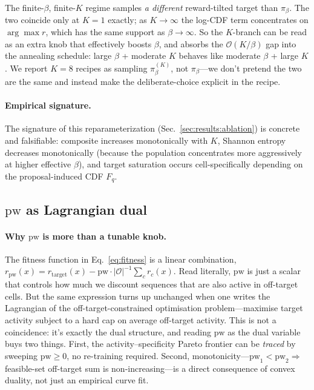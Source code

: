 \begin{remark}\label{rem:K_practical}
The finite-$\beta$, finite-$K$ regime samples \emph{a different} reward-tilted target than $\pi_\beta$. The two coincide only at $K\!=\!1$ exactly; as $K\!\to\!\infty$ the log-CDF term concentrates on $\arg\max r$, which has the same support as $\beta\!\to\!\infty$. So the $K$-branch can be read as an extra knob that effectively boosts $\beta$, and \gpa{} absorbs the $\mathcal{O}(K/\beta)$ gap into the annealing schedule: large $\beta$ + moderate $K$ behaves like moderate $\beta$ + large $K$. We report $K\!=\!8$ recipes as sampling $\pi_\beta^{(K)}$, not $\pi_\beta$—we don't pretend the two are the same and instead make the deliberate-choice explicit in the recipe.
\end{remark}

\paragraph{Empirical signature.}
The signature of this reparameterization (Sec.~\ref{sec:results:ablation}) is concrete and falsifiable: composite increases monotonically with $K$, Shannon entropy decreases monotonically (because the population concentrates more aggressively at higher effective $\beta$), and target saturation occurs cell-specifically depending on the proposal-induced CDF $F_q$.

\subsection{$\mathrm{pw}$ as Lagrangian dual}\label{app:lagrangian}

\paragraph{Why $\mathrm{pw}$ is more than a tunable knob.}
The fitness function in Eq.~\eqref{eq:fitness} is a linear combination, $r_{\mathrm{pw}}(x)\!=\!r_{\mathrm{target}}(x)\!-\!\mathrm{pw}\cdot|\mathcal{O}|^{-1}\sum_c r_c(x)$. Read literally, $\mathrm{pw}$ is just a scalar that controls how much we discount sequences that are also active in off-target cells. But the same expression turns up unchanged when one writes the Lagrangian of the off-target-constrained optimisation problem—maximise target activity subject to a hard cap on average off-target activity. This is not a coincidence: it's exactly the dual structure, and reading $\mathrm{pw}$ as the dual variable buys two things. First, the activity–specificity Pareto frontier can be \emph{traced} by sweeping $\mathrm{pw}\!\geq\!0$, no re-training required. Second, monotonicity—$\mathrm{pw}_1\!<\!\mathrm{pw}_2\!\Rightarrow$ feasible-set off-target sum is non-increasing—is a direct consequence of convex duality, not just an empirical curve fit.


